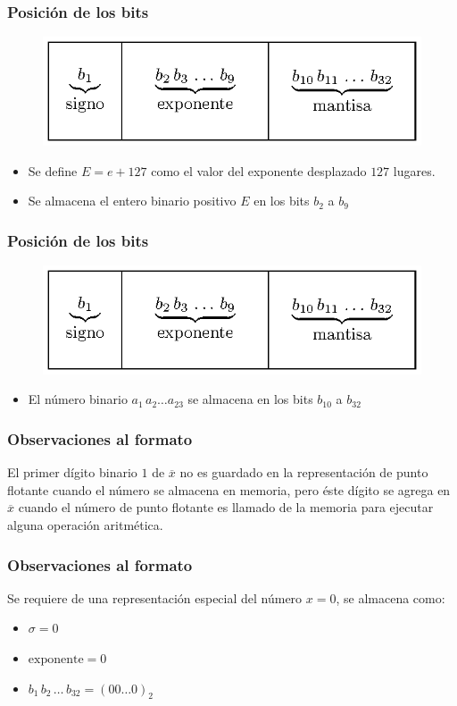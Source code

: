 \documentclass[12pt]{beamer}
\begin{document}
\begin{frame}
\frametitle{Posición de los bits}
\begin{figure}
    \centering
    \includegraphics[scale=1.2]{Imagenes/precision_simple.eps}
\end{figure}
\begin{itemize}[<+->]
\item[\ding{212}] Se define $E = e + 127$ como el valor del \textcolor{cadmiumgreen}{exponente} desplazado $127$ lugares.
\item[\ding{212}] Se almacena el entero binario positivo $E$ en los bits $b_{2}$ a $b_{9}$
\end{itemize}
\end{frame}
\begin{frame}
\frametitle{Posición de los bits}
\begin{figure}
    \centering
    \includegraphics[scale=1.2]{Imagenes/precision_simple.eps}
\end{figure}
\begin{itemize}
\item[\ding{212}] El número binario $a_{1} \, a_{2} \ldots a_{23}$ se almacena en los bits $b_{10}$ a $b_{32}$
\end{itemize}
\end{frame}
\begin{frame}
\frametitle{Observaciones al formato}
El primer dígito binario $1$ de $\overline{x}$ no es guardado en la representación de punto flotante cuando el número se almacena en memoria, \pause pero éste dígito se agrega en $\overline{x}$ cuando el número de punto flotante es llamado de la memoria para ejecutar alguna operación aritmética.
\end{frame}
\begin{frame}
\frametitle{Observaciones al formato}
Se requiere de una representación especial del número $x = 0$, se almacena como:
\begin{itemize}
\item[\ding{212}] $\sigma = 0$
\item[\ding{212}] $\text{exponente} = 0$
\item[\ding{212}] $b_{1} \, b_{2} \, \ldots \, b_{32} = (00 \ldots 0)_{2}$
\end{itemize}
\end{frame}
\end{document}
